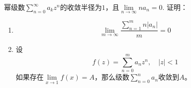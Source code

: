 \begin{theorem}[Tauber定理]

    幂级数$\sum\limits_{n = 0}^{\infty}{a_k z^n}$的收敛半径为$1$，且$\lim\limits_{n \to \infty}{na_n} = 0$. 证明：

    \begin{enumerate}
        
        \item $$\lim\limits_{m \to \infty}{\dfrac{\sum\limits_{n = 1}^{m}{n|a_n|}}{m}} = 0$$
        
        \item 
            设
            $$f(z) = \sum\limits_{n = 0}^{m}{a_n z^n}, \quad |z| < 1$$
            如果存在$\lim\limits_{x \to 1}{f(x)} = A$，那么级数$\sum\limits_{n = 0}^{n}{a_n}$收敛到$A$。
        
    \end{enumerate}

\end{theorem}


